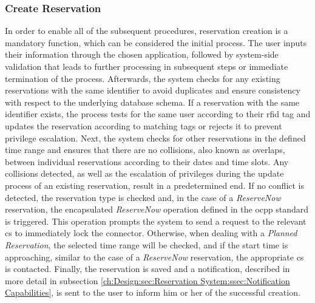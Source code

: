 \subsubsection{Create Reservation}
\label{ch:Design:sec:Reservation System:ssec:Management Capabilities:sssec:Create Reservation}

In order to enable all of the subsequent procedures, reservation creation is a mandatory function, which can be considered the initial process. The user inputs their information through the chosen application, followed by system-side validation that leads to further processing in subsequent steps or immediate termination of the process.
Afterwards, the system checks for any existing reservations with the same identifier to avoid duplicates and ensure consistency with respect to the underlying database schema. If a reservation with the same identifier exists, the process tests for the same user according to their \acrshort{rfid} tag and updates the reservation according to matching tags or rejects it to prevent privilege escalation.
Next, the system checks for other reservations in the defined time range and ensures that there are no collisions, also known as overlaps, between individual reservations according to their dates and time slots.
Any collisions detected, as well as the escalation of privileges during the update process of an existing reservation, result in a predetermined end.
If no conflict is detected, the reservation type is checked and, in the case of a \textit{ReserveNow} reservation, the encapsulated \textit{ReserveNow} operation defined in the \acrshort{ocpp} standard \cite{noauthor_ocpp_nodate} is triggered. This operation prompts the system to send a request to the relevant \acrshort{cs} to immediately lock the connector. 
Otherwise, when dealing with a \textit{Planned Reservation}, the selected time range will be checked, and if the start time is approaching, similar to the case of a \textit{ReserveNow} reservation, the appropriate \acrshort{cs} is contacted.
Finally, the reservation is saved and a notification, described in more detail in subsection \ref{ch:Design:sec:Reservation System:ssec:Notification Capabilities}, is sent to the user to inform him or her of the successful creation.

